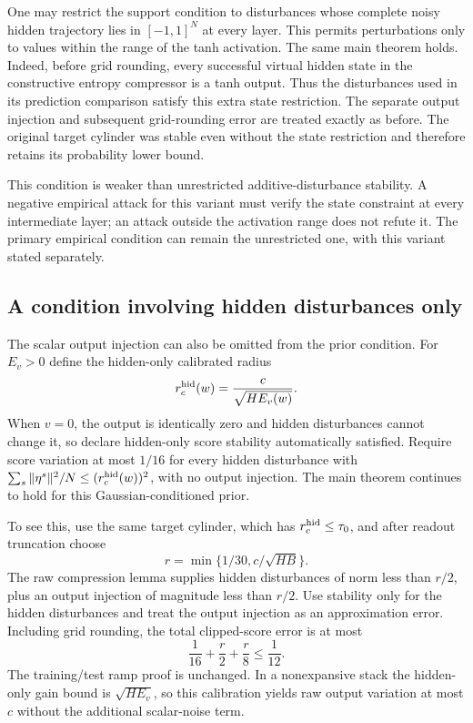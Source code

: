 One may restrict the support condition to disturbances whose complete
noisy hidden trajectory lies in $[-1,1]^N$ at every layer. This permits
perturbations only to values within the range of the tanh activation.
The same main theorem holds. Indeed, before grid rounding, every successful
virtual hidden state in the constructive entropy compressor is a tanh
output. Thus the disturbances used in its prediction comparison satisfy
this extra state restriction. The separate output injection and subsequent
grid-rounding error are treated exactly as before. The original target
cylinder was stable even without the state restriction and therefore
retains its probability lower bound.

This condition is weaker than unrestricted additive-disturbance stability.
A negative empirical attack for this variant must verify the state
constraint at every intermediate layer; an attack outside the activation
range does not refute it. The primary empirical condition can remain the
unrestricted one, with this variant stated separately.

\subsection{A condition involving hidden disturbances only}

The scalar output injection can also be omitted from the prior condition.
For $E_v>0$ define the hidden-only calibrated radius
\[
 r^{\rm hid}_c(w)=\frac{c}{\sqrt{H E_v(w)}}.
\]
When $v=0$, the output is identically zero and hidden disturbances cannot
change it, so declare hidden-only score stability automatically satisfied.
Require score variation at most $1/16$ for every hidden disturbance with
$\sum_s\|\eta^s\|^2/N\le(r^{\rm hid}_c(w))^2$, with no output injection.
The main theorem continues to hold for this Gaussian-conditioned prior.

To see this, use the same target cylinder, which has
$r^{\rm hid}_c\le\tau_0$, and after readout truncation choose
\[
 r=\min\{1/30,c/\sqrt{HB}\}.
\]
The raw compression lemma supplies hidden disturbances of norm less than
$r/2$, plus an output injection of magnitude less than $r/2$.
Use stability only for the hidden disturbances and treat the output
injection as an approximation error. Including grid rounding, the total
clipped-score error is at most
\[
 \frac1{16}+\frac r2+\frac r8\le\frac1{12}.
\]
The training/test ramp proof is unchanged. In a nonexpansive stack the
hidden-only gain bound is $\sqrt{H E_v}$, so this calibration yields raw
output variation at most $c$ without the additional scalar-noise term.

